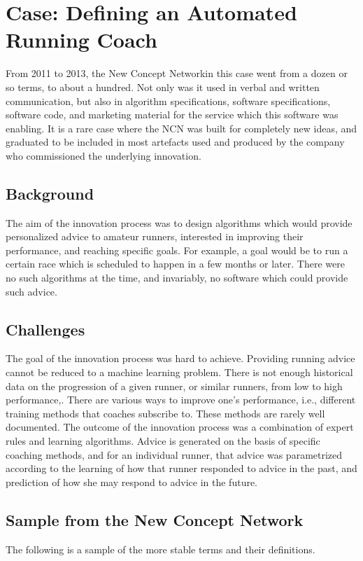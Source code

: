 \documentclass[graybox,envcountchap,sectrefs]{svmono}
\newcommand{\ncn}{NCN}
\newcommand{\ncnf}{New Concept Network}
\begin{document}
\chapter{Case: Defining an Automated Running Coach}\label{c:case:defining-automated-running-coach}

From 2011 to 2013, the \ncnf in this case went from a dozen or so terms, to about a hundred. Not only was it used in verbal and written communication, but also in algorithm specifications, software specifications, software code, and marketing material for the service which this software was enabling. It is a rare case where the \ncn{} was built for completely new ideas, and graduated to be included in most artefacts used and produced by the company who commissioned the underlying innovation.

\section{Background}
The aim of the innovation process was to design algorithms which would provide personalized advice to amateur runners, interested in improving their performance, and reaching specific goals. For example, a goal would be to run a certain race which is scheduled to happen in a few months or later. There were no such algorithms at the time, and invariably, no software which could provide such advice.

\section{Challenges}
The goal of the innovation process was hard to achieve. Providing running advice cannot be reduced to a machine learning problem. There is not enough historical data on the progression of a given runner, or similar runners, from low to high performance,. There are various ways to improve one's performance, i.e., different training methods that coaches subscribe to. These methods are rarely well documented. The outcome of the innovation process was a combination of expert rules and learning algorithms. Advice is generated on the basis of specific coaching methods, and for an individual runner, that advice was parametrized according to the learning of how that runner responded to advice in the past, and prediction of how she may respond to advice in the future. 

\section{Sample from the \ncnf}
The following is a sample of the more stable terms and their definitions. 
\end{document}
